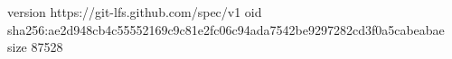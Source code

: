 version https://git-lfs.github.com/spec/v1
oid sha256:ae2d948cb4c55552169c9c81e2fc06c94ada7542be9297282cd3f0a5cabeabae
size 87528
